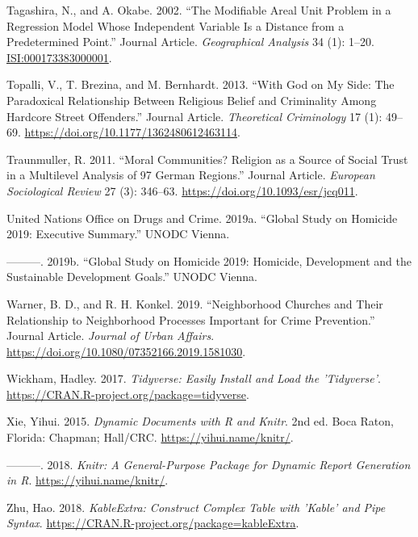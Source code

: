 \documentclass[smallextended]{svjour3}       %
\begin{document}
\leavevmode\hypertarget{ref-Tagashira2002modifiable}{}%
Tagashira, N., and A. Okabe. 2002. ``The Modifiable Areal Unit Problem
in a Regression Model Whose Independent Variable Is a Distance from a
Predetermined Point.'' Journal Article. \emph{Geographical Analysis} 34
(1): 1--20. \url{ISI:000173383000001}.

\leavevmode\hypertarget{ref-Topalli2013god}{}%
Topalli, V., T. Brezina, and M. Bernhardt. 2013. ``With God on My Side:
The Paradoxical Relationship Between Religious Belief and Criminality
Among Hardcore Street Offenders.'' Journal Article. \emph{Theoretical
Criminology} 17 (1): 49--69.
\url{https://doi.org/10.1177/1362480612463114}.

\leavevmode\hypertarget{ref-Traunmuller2011moral}{}%
Traunmuller, R. 2011. ``Moral Communities? Religion as a Source of
Social Trust in a Multilevel Analysis of 97 German Regions.'' Journal
Article. \emph{European Sociological Review} 27 (3): 346--63.
\url{https://doi.org/10.1093/esr/jcq011}.

\leavevmode\hypertarget{ref-Unodc2019executive}{}%
United Nations Office on Drugs and Crime. 2019a. ``Global Study on
Homicide 2019: Executive Summary.'' UNODC Vienna.

\leavevmode\hypertarget{ref-Unodc2019development}{}%
---------. 2019b. ``Global Study on Homicide 2019: Homicide, Development
and the Sustainable Development Goals.'' UNODC Vienna.

\leavevmode\hypertarget{ref-Warner2019neighborhood}{}%
Warner, B. D., and R. H. Konkel. 2019. ``Neighborhood Churches and Their
Relationship to Neighborhood Processes Important for Crime Prevention.''
Journal Article. \emph{Journal of Urban Affairs}.
\url{https://doi.org/10.1080/07352166.2019.1581030}.

\leavevmode\hypertarget{ref-Wickham2017}{}%
Wickham, Hadley. 2017. \emph{Tidyverse: Easily Install and Load the
'Tidyverse'}. \url{https://CRAN.R-project.org/package=tidyverse}.

\leavevmode\hypertarget{ref-Xie2015}{}%
Xie, Yihui. 2015. \emph{Dynamic Documents with R and Knitr}. 2nd ed.
Boca Raton, Florida: Chapman; Hall/CRC. \url{https://yihui.name/knitr/}.

\leavevmode\hypertarget{ref-Xie2018}{}%
---------. 2018. \emph{Knitr: A General-Purpose Package for Dynamic
Report Generation in R}. \url{https://yihui.name/knitr/}.

\leavevmode\hypertarget{ref-Zhu2018}{}%
Zhu, Hao. 2018. \emph{KableExtra: Construct Complex Table with 'Kable'
and Pipe Syntax}. \url{https://CRAN.R-project.org/package=kableExtra}.



\end{document}
